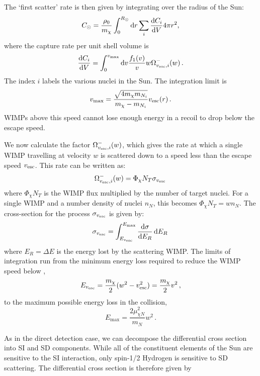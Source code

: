 The `first scatter' rate is then given by integrating over the radius of the Sun:
\begin{equation}
C_{\odot} = \frac{\rho_0}{m_\chi} \int_{0}^{R_{\odot}} \textrm{d}r \sum_i \frac{\mathrm{d}C_i}{\mathrm{d}V} 4 \pi r^{2},
\end{equation}
where the capture rate per unit shell volume is
\begin{equation}
\label{eq:NT:dCdV}
\dbd{C_i}{V} = \int_{0}^{v_{\textrm{max}}} \textrm{d}v \frac{f_1(v)}{v} w \ScatRate\,.
\end{equation}
The index \(i\) labels the various nuclei in the Sun. The integration limit is
\begin{equation}
v_{\textrm{max}} = \frac{\sqrt{4m_\chi m_{N_i}}}{m_\chi - m_{N_i}}\vesc(r)\,.
\end{equation}
WIMPs above this speed cannot lose enough energy in a recoil to drop below the escape speed.

We now calculate the factor $\ScatRate$, which gives the rate at which a single WIMP travelling at velocity \(w\) is scattered down to a speed less than the escape speed \(\vesc\). This rate can be written as:
\begin{equation}
\ScatRate = \Phi_\chi N_T \sigma_{\vesc}\,
\end{equation}
where \(\Phi_\chi N_T\) is the WIMP flux multiplied by the number of target nuclei. For a single WIMP and a number density of nuclei \(n_N\), this becomes \( \Phi_\chi N_T = w n_N\). The cross-section for the process \(\sigma_{\vesc}\) is given by:
\begin{equation}
\label{eq:NT:sigma}
\sigma_{\vesc}  = \int_{E_{\vesc}}^{E_\textrm{max}} \dbd{\sigma}{E_R} \, \textrm{d}E_R\,
\end{equation}
where \(E_R = \Delta E\) is the energy lost by the scattering WIMP. The limits of integration run from the minimum energy loss required to reduce the WIMP speed below \vesc,
\begin{equation}
E_{\vesc} = \frac{m_\chi}{2}(w^2 - \vesc^2) = \frac{m_\chi}{2}v^2\,,
\end{equation}
to the maximum possible energy loss in the collision,
\begin{equation}
E_\textrm{max} = \frac{2 \mu_{\chi N}^2}{m_N} w^2\,.
\end{equation}

As in the direct detection case, we can decompose the differential cross section into SI and SD components. While all of the constituent elements of the Sun are sensitive to the SI interaction, only spin-1/2 Hydrogen is sensitive to SD scattering. The differential cross section is therefore given by

